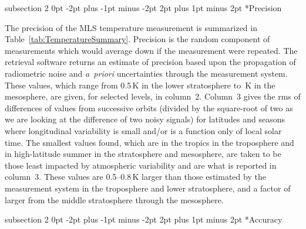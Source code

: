 \documentclass[11pt,draft]{report}
\makeatletter
\renewcommand{\subsection}{\@startsection%
  {subsection}%
  {2}%
  {0pt}%
  {-2pt plus -1pt minus -2pt}%
  {2pt plus 1pt minus 2pt}%
  {\large\sffamily\fontseries{sb}\selectfont\flushleft\color{SectionColor}\figureversion{tabular}}}%
\makeatother
\begin{document}
\subsection*{Precision}

The precision of the MLS \thisv temperature measurement is summarized in
Table~\ref{tab:TemperatureSummary}.  Precision is the random component
of measurements which would average down if the measurement were
repeated.  The retrieval software returns an estimate of precision based
upon the propagation of radiometric noise and \emph{a~priori}
uncertainties through the measurement system.  These values, which range
from 0.5\,K in the lower stratosphere to \,K in the
mesosphere, are given, for selected levels, in column~2.  Column~3 gives
the rms of differences of values from successive orbits (divided by the
square-root of two as we are looking at the difference of two noisy
signals) for latitudes and seasons where longitudinal variability is
small and/or is a function only of local solar time.  The smallest
values found, which are in the tropics in the troposphere and in 
high-latitude summer in the stratosphere and mesosphere, are taken to be those
least impacted by atmospheric variability and are what is reported in
column~3.  These values are 0.5--0.8\,K larger than those estimated by the
measurement system in the troposphere and lower stratosphere, and a
factor of  larger from the middle stratosphere through
the mesosphere.

\subsection*{Accuracy}
\end{document}

